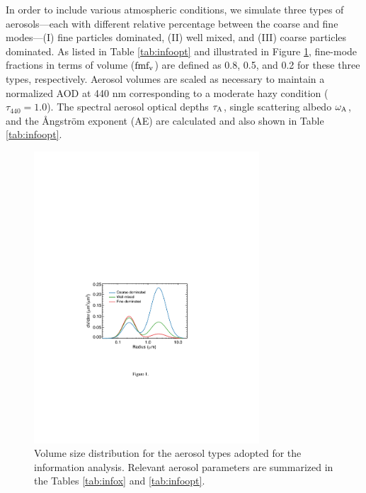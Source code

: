 In order to include various atmospheric conditions, we simulate three types of
aerosols---each with different relative percentage between the coarse and fine
modes---(I) fine particles dominated, (II) well mixed, and (III) coarse
particles dominated. As listed in Table \ref{tab:infoopt} and illustrated 
in Figure \ref{fig:infopsd}, fine-mode
fractions in terms of volume ($\text{fmf}_\text{v}$) are defined as 0.8, 0.5, and 0.2 for these
three types, respectively. Aerosol volumes are scaled as necessary to maintain
a normalized AOD at 440 nm corresponding to a moderate hazy condition
($\tau_{440}=1.0$). The spectral aerosol optical depths $\tau_\text{A}$, 
single scattering albedo $\omega_\text{A}$, and the Ångström exponent (AE) 
are calculated and also shown in Table \ref{tab:infoopt}. 

\begin{figure}[t]
  \centering
  \includegraphics[width={0.75\textwidth}]{figures/info01.pdf}
  \caption{Volume size distribution for the aerosol types adopted for the
information analysis. Relevant aerosol parameters are summarized in the Tables
\ref{tab:infox} and \ref{tab:infoopt}.}
  \label{fig:infopsd}
\end{figure}

